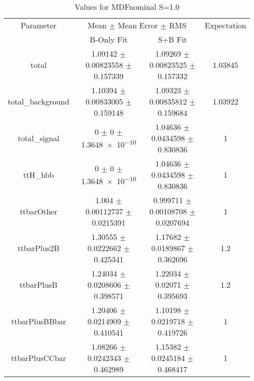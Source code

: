 \begin{table}
\centering
\caption{Values for MDFnominal S=1.0}
\begin{tabular}{cccc}
\toprule
Parameter & \multicolumn{2}{c}{Mean $\pm$ Mean Error $\pm$ RMS} & Expectation\\
 & B-Only Fit & S+B Fit & \\
\midrule
total & \num{1.09142} $\pm$ \num{0.00823558} $\pm$ \num{0.157339} & \num{1.09269} $\pm$ \num{0.00823525} $\pm$ \num{0.157332} & \num{1.03845}\\
total\_background & \num{1.10394} $\pm$ \num{0.00833005} $\pm$ \num{0.159148} & \num{1.09323} $\pm$ \num{0.00835812} $\pm$ \num{0.159684} & \num{1.03922}\\
total\_signal & \num{0} $\pm$ \num{0} $\pm$ \num{1.3648e-10} & \num{1.04636} $\pm$ \num{0.0434598} $\pm$ \num{0.830836} & \num{1}\\
ttH\_hbb & \num{0} $\pm$ \num{0} $\pm$ \num{1.3648e-10} & \num{1.04636} $\pm$ \num{0.0434598} $\pm$ \num{0.830836} & \num{1}\\
ttbarOther & \num{1.004} $\pm$ \num{0.00112737} $\pm$ \num{0.0215391} & \num{0.999711} $\pm$ \num{0.00108708} $\pm$ \num{0.0207694} & \num{1}\\
ttbarPlus2B & \num{1.30555} $\pm$ \num{0.0222662} $\pm$ \num{0.425341} & \num{1.17682} $\pm$ \num{0.0189867} $\pm$ \num{0.362696} & \num{1.2}\\
ttbarPlusB & \num{1.24034} $\pm$ \num{0.0208606} $\pm$ \num{0.398571} & \num{1.22034} $\pm$ \num{0.02071} $\pm$ \num{0.395693} & \num{1.2}\\
ttbarPlusBBbar & \num{1.20406} $\pm$ \num{0.0214909} $\pm$ \num{0.410541} & \num{1.10198} $\pm$ \num{0.0219718} $\pm$ \num{0.419726} & \num{1}\\
ttbarPlusCCbar & \num{1.08266} $\pm$ \num{0.0242343} $\pm$ \num{0.462989} & \num{1.15382} $\pm$ \num{0.0245184} $\pm$ \num{0.468417} & \num{1}\\
\bottomrule
\end{tabular}
\end{table}